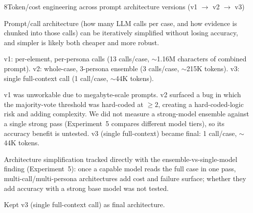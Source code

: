 \begin{explog}{8}{Token/cost engineering across prompt architecture versions (v1 $\to$ v2 $\to$ v3)}
\item[Hypothesis] Prompt/call architecture (how many LLM calls per case, and how evidence is chunked into those calls) can be iteratively simplified without losing accuracy, and simpler is likely both cheaper and more robust.
\item[Method] v1: per-element, per-persona calls (13 calls/case, $\sim$1.16M characters of combined prompt). v2: whole-case, 3-persona ensemble (3 calls/case, $\sim$215K tokens). v3: single full-context call (1 call/case, $\sim$44K tokens).
\item[Result] v1 was unworkable due to megabyte-scale prompts. v2 surfaced a bug in which the majority-vote threshold was hard-coded at $\geq 2$, creating a hard-coded-logic risk and adding complexity. We did not measure a strong-model ensemble against a single strong pass (Experiment~5 compares different model tiers), so its accuracy benefit is untested. v3 (single full-context) became final: 1 call/case, $\sim$44K tokens.
\item[Inference] Architecture simplification tracked directly with the ensemble-vs-single-model finding (Experiment~5): once a capable model reads the full case in one pass, multi-call/multi-persona architectures add cost and failure surface; whether they add accuracy with a strong base model was not tested.
\item[Verdict] Kept v3 (single full-context call) as final architecture.
\end{explog}


